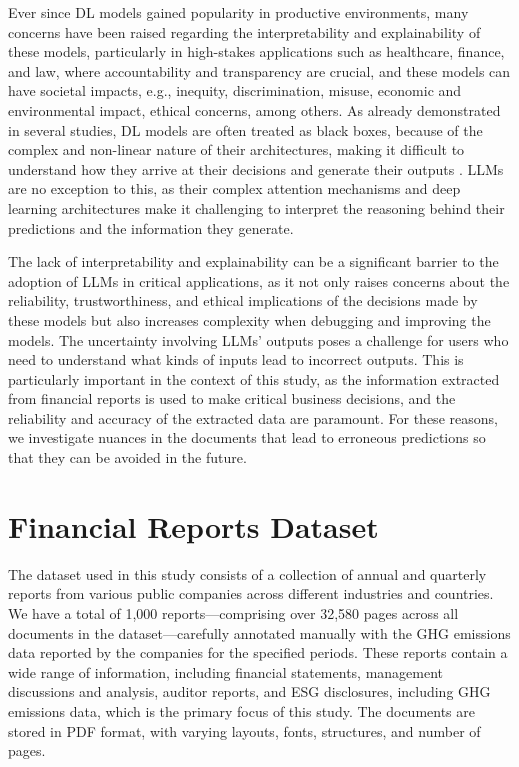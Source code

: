 \documentclass[english, 12pt, a4paper, elec, utf8, a-2b, online]{aaltothesis}
\begin{document}
Ever since \ac{DL} models gained popularity in productive environments, many concerns have been raised regarding the interpretability and explainability of these models, particularly in high-stakes applications such as healthcare, finance, and law, where accountability and transparency are crucial, and these models can have societal impacts, e.g., inequity, discrimination, misuse, economic and environmental impact, ethical concerns, among others.
As already demonstrated in several studies, \ac{DL} models are often treated as black boxes, because of the complex and non-linear nature of their architectures, making it difficult to understand how they arrive at their decisions and generate their outputs \cite{castelvecchi2016can, 2018_survey_explaining_black_box}.
\ac{LLM}s are no exception to this, as their complex attention mechanisms and deep learning architectures make it challenging to interpret the reasoning behind their predictions and the information they generate.

The lack of interpretability and explainability can be a significant barrier to the adoption of \ac{LLM}s in critical applications, as it not only raises concerns about the reliability, trustworthiness, and ethical implications of the decisions made by these models but also increases complexity when debugging and improving the models.
The uncertainty involving \ac{LLM}s' outputs poses a challenge for users who need to understand what kinds of inputs lead to incorrect outputs.
This is particularly important in the context of this study, as the information extracted from financial reports is used to make critical business decisions, and the reliability and accuracy of the extracted data are paramount.
For these reasons, we investigate nuances in the documents that lead to erroneous predictions so that they can be avoided in the future.

\clearpage

\section{Financial Reports Dataset}
\label{sec:dataset}

The dataset used in this study consists of a collection of annual and quarterly reports from various public companies across different industries and countries.
We have a total of 1,000 reports—comprising over 32,580 pages across all documents in the dataset—carefully annotated manually with the \ac{GHG} emissions data reported by the companies for the specified periods.
These reports contain a wide range of information, including financial statements, management discussions and analysis, auditor reports, and \ac{ESG} disclosures, including \ac{GHG} emissions data, which is the primary focus of this study.
The documents are stored in \ac{PDF} format, with varying layouts, fonts, structures, and number of pages.
\end{document}
